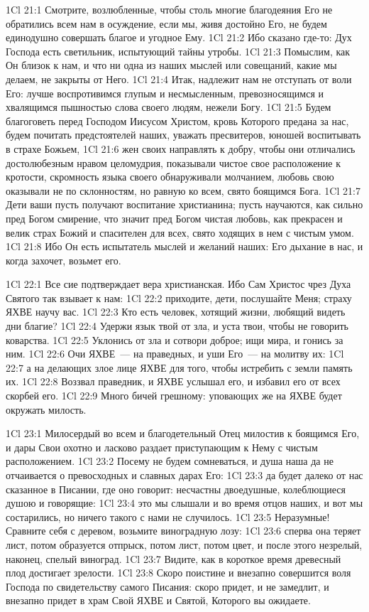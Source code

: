 \vs 1Cl 21:1
Смотрите, возлюбленные,
чтобы столь многие благодеяния Его не обратились всем нам в осуждение, если
мы, живя достойно Его, не будем единодушно совершать благое и угодное Ему.
\vs 1Cl 21:2
Ибо сказано где-то: Дух
Господа есть светильник, испытующий тайны утробы.
\vs 1Cl 21:3
Помыслим, как Он близок к
нам, и что ни одна из наших мыслей или совещаний, какие мы делаем, не закрыты
от Него.
\vs 1Cl 21:4
Итак, надлежит нам не
отступать от воли Его: лучше воспротивимся глупым и несмысленным,
превозносящимся и хвалящимся пышностью слова своего людям, нежели Богу.
\vs 1Cl 21:5
Будем благоговеть перед
Господом Иисусом Христом, кровь Которого предана за нас, будем почитать
предстоятелей наших, уважать пресвитеров, юношей воспитывать в страхе Божьем,
\vs 1Cl 21:6
жен своих направлять к
добру, чтобы они отличались достолюбезным нравом целомудрия, показывали чистое
свое расположение к кротости, скромность языка своего обнаруживали молчанием,
любовь свою оказывали не по склонностям, но равную ко всем, свято боящимся
Бога.
\vs 1Cl 21:7
Дети ваши пусть получают
воспитание христианина; пусть научаются, как сильно пред Богом смирение, что
значит пред Богом чистая любовь, как прекрасен и велик страх Божий и
спасителен для всех, свято ходящих в нем с чистым умом.
\vs 1Cl 21:8
Ибо Он есть испытатель
мыслей и желаний наших: Его дыхание в нас, и когда захочет, возьмет его.

\vs 1Cl 22:1
Все сие подтверждает вера
христианская. Ибо Сам Христос чрез Духа Святого так взывает к нам:
\vs 1Cl 22:2
приходите, дети,
послушайте Меня; страху ЯХВЕ научу вас.
\vs 1Cl 22:3
Кто есть человек, хотящий
жизни, любящий видеть дни благие?
\vs 1Cl 22:4
Удержи язык твой от зла, и
уста твои, чтобы не говорить коварства.
\vs 1Cl 22:5
Уклонись от зла и сотвори
доброе; ищи мира, и гонись за ним.
\vs 1Cl 22:6
Очи ЯХВЕ~--- на праведных, и
уши Его~--- на молитву их:
\vs 1Cl 22:7
а на делающих злое лице
ЯХВЕ для того, чтобы истребить с земли память их.
\vs 1Cl 22:8
Воззвал праведник, и ЯХВЕ
услышал его, и избавил его от всех скорбей его.
\vs 1Cl 22:9
Много бичей грешному:
уповающих же на ЯХВЕ будет окружать милость.

\vs 1Cl 23:1
Милосердый во всем и
благодетельный Отец милостив к боящимся Его, и дары Свои охотно и ласково
раздает приступающим к Нему с чистым расположением.
\vs 1Cl 23:2
Посему не будем
сомневаться, и душа наша да не отчаивается о превосходных и славных дарах Его:
\vs 1Cl 23:3
да будет далеко от нас
сказанное в Писании, где оно говорит: несчастны двоедушные, колеблющиеся
душою и говорящие:
\vs 1Cl 23:4
это мы слышали и во время
отцов наших, и вот мы состарились, но ничего такого с нами не случилось.
\vs 1Cl 23:5
Неразумные! Сравните себя
с деревом, возьмите виноградную лозу:
\vs 1Cl 23:6
сперва она теряет лист,
потом образуется отпрыск, потом лист, потом цвет, и после этого незрелый,
наконец, спелый виноград.
\vs 1Cl 23:7
Видите, как в короткое
время древесный плод достигает зрелости.
\vs 1Cl 23:8
Скоро поистине и внезапно
совершится воля Господа по свидетельству самого Писания: скоро придет, и не
замедлит, и внезапно придет в храм Свой ЯХВЕ и Святой, Которого вы ожидаете.

